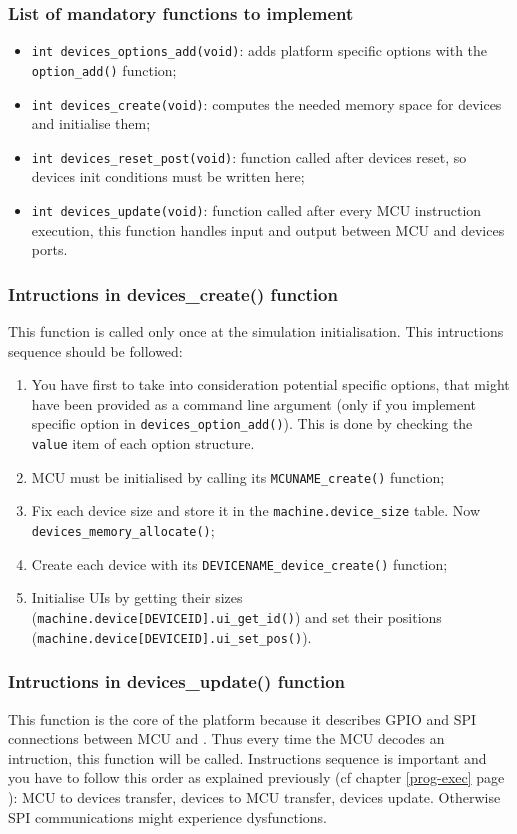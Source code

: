 \documentclass[a4paper,10pt]{report}
\begin{document}
\subsubsection{List of mandatory functions to implement}
\begin{itemize}
  \item \verb$int devices_options_add(void)$: adds platform specific options with the \verb$option_add()$ function;
  \item \verb$int devices_create(void)$: computes the needed memory space for devices and initialise them;
  \item \verb$int devices_reset_post(void)$: function called after devices reset, so devices init conditions must be written here;	
  \item \verb$int devices_update(void)$: function called after every MCU instruction execution, this function handles input and output between MCU and devices ports.
\end{itemize}

\subsubsection{Intructions in devices\_create() function}
This function is called only once at the simulation initialisation. This intructions sequence should be followed:
\begin{enumerate}
  \item You have first to take into consideration potential specific options, that might have been provided as a command line argument (only if you implement specific option in \verb$devices_option_add()$). This is done by checking the \verb$value$ item of each option structure.
  \item MCU must be initialised by calling its \verb$MCUNAME_create()$ function;
  \item Fix each device size and store it in the \verb$machine.device_size$ table. Now \verb$devices_memory_allocate()$;
  \item Create each device with its \verb$DEVICENAME_device_create()$ function;
  \item Initialise UIs by getting their sizes (\verb$machine.device[DEVICEID].ui_get_id()$) and set their positions (\verb$machine.device[DEVICEID].ui_set_pos()$).
\end{enumerate}

\subsubsection{Intructions in devices\_update() function}
This function is the core of the platform because it describes GPIO and SPI connections between MCU and . Thus every time the MCU decodes an intruction, this function will be called.
Instructions sequence is important and you have to follow this order as explained previously (cf chapter \ref{prog-exec} page \pageref{prog-exec}): MCU to devices transfer, devices to MCU transfer, devices update. Otherwise SPI communications might experience dysfunctions.
\end{document}
